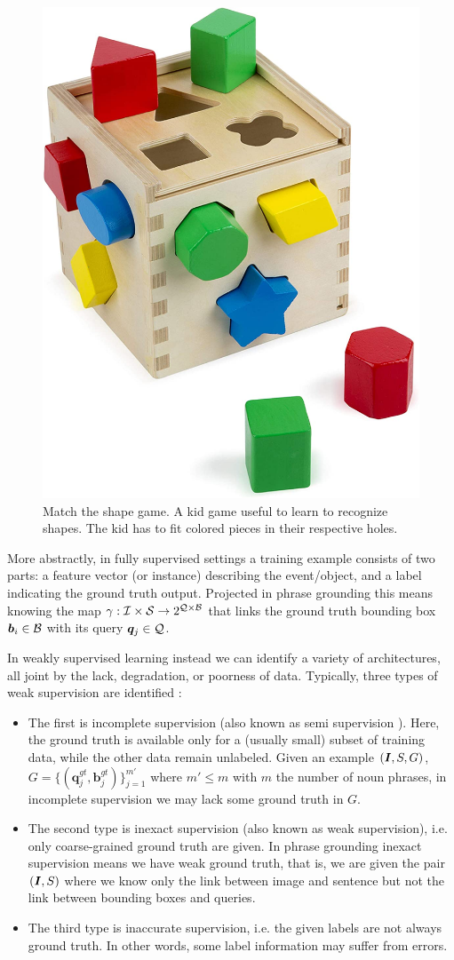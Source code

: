 \begin{figure}[H]
  \centering
  \includegraphics[width=.4\textwidth]{figures/match-shapes-game.jpg}
  \caption[Match the shape game]{
    Match the shape game. A kid game useful to learn to recognize
    shapes. The kid has to fit colored pieces in their respective
    holes.
  }
  \label{fig:match-the-shape-game}
\end{figure}

More abstractly, in fully supervised settings a training example
consists of two parts: a feature vector (or instance) describing the
event/object, and a label indicating the ground truth output.
Projected in phrase grounding this means knowing the map $\gamma :
\mathcal{I} \times \mathcal{S} \rightarrow 2^{\mathcal{Q} \times \mathcal{B}}$ that links the
ground truth bounding box $\bm{b}_i \in \mathcal{B}$ with its query
$\bm{q}_j \in \mathcal{Q}$.

In weakly supervised learning instead we can identify a variety of
architectures, all joint by the lack, degradation, or poorness of
data. Typically, three types of weak supervision are identified
\cite{zhou2018brief}:

\begin{itemize}
  \item The first is incomplete supervision (also known as semi
  supervision \cite{rohrbach2016grounding}). Here, the ground truth is
  available only for a (usually small) subset of training data, while
  the other data remain unlabeled. Given an example $(\bm{I}, S,
  G)$, $G = \{ (\bm{q}^{gt}_j, \bm{b}^{gt}_j) \}^{m'}_{j=1}$ where $m'
  \leq m$ with $m$ the number of noun phrases, in incomplete
  supervision we may lack some ground truth in $G$.
  \item The second type is inexact supervision (also known as weak
  supervision), i.e. only coarse-grained ground truth are given. In
  phrase grounding inexact supervision means we have weak ground
  truth, that is, we are given the pair $(\bm{I}, S)$ where we
  know only the link between image and sentence but not the link
  between bounding boxes and queries.
  \item The third type is inaccurate supervision, i.e. the given
  labels are not always ground truth. In other words, some label
  information may suffer from errors.
\end{itemize}

